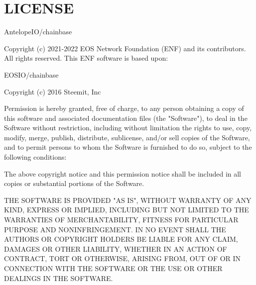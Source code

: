 \chapter{LICENSE}
\hypertarget{md_libraries_2chainbase_2_l_i_c_e_n_s_e}{}\label{md_libraries_2chainbase_2_l_i_c_e_n_s_e}
Antelope\+IO/chainbase

Copyright (c) 2021-\/2022 EOS Network Foundation (ENF) and its contributors. All rights reserved. This ENF software is based upon\+:

EOSIO/chainbase

Copyright (c) 2016 Steemit, Inc

Permission is hereby granted, free of charge, to any person obtaining a copy of this software and associated documentation files (the "{}\+Software"{}), to deal in the Software without restriction, including without limitation the rights to use, copy, modify, merge, publish, distribute, sublicense, and/or sell copies of the Software, and to permit persons to whom the Software is furnished to do so, subject to the following conditions\+:

The above copyright notice and this permission notice shall be included in all copies or substantial portions of the Software.

THE SOFTWARE IS PROVIDED "{}\+AS IS"{}, WITHOUT WARRANTY OF ANY KIND, EXPRESS OR IMPLIED, INCLUDING BUT NOT LIMITED TO THE WARRANTIES OF MERCHANTABILITY, FITNESS FOR  PARTICULAR PURPOSE AND NONINFRINGEMENT. IN NO EVENT SHALL THE AUTHORS OR COPYRIGHT HOLDERS BE LIABLE FOR ANY CLAIM, DAMAGES OR OTHER LIABILITY, WHETHER IN AN ACTION OF CONTRACT, TORT OR OTHERWISE, ARISING FROM, OUT OF OR IN CONNECTION WITH THE SOFTWARE OR THE USE OR OTHER DEALINGS IN THE SOFTWARE. 